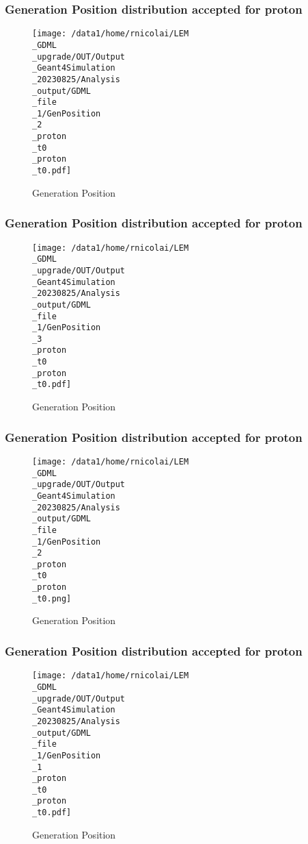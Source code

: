 \documentclass[8pt]{beamer}
\begin{document}
            \begin{frame}
                \frametitle{Generation Position distribution accepted for proton}
            
        \begin{figure}[h]
            \centering
            \texttt{[image: /data1/home/rnicolai/LEM\\\_GDML\\\_upgrade/OUT/Output\\\_Geant4Simulation\\\_20230825/Analysis\\\_output/GDML\\\_file\\\_1/GenPosition\\\_2\\\_proton\\\_t0\\\_proton\\\_t0.pdf]}
            \caption{Generation Position}
        \end{figure}
        
            \end{frame}
            
            \begin{frame}
                \frametitle{Generation Position distribution accepted for proton}
            
        \begin{figure}[h]
            \centering
            \texttt{[image: /data1/home/rnicolai/LEM\\\_GDML\\\_upgrade/OUT/Output\\\_Geant4Simulation\\\_20230825/Analysis\\\_output/GDML\\\_file\\\_1/GenPosition\\\_3\\\_proton\\\_t0\\\_proton\\\_t0.pdf]}
            \caption{Generation Position}
        \end{figure}
        
            \end{frame}
            
            \begin{frame}
                \frametitle{Generation Position distribution accepted for proton}
            
        \begin{figure}[h]
            \centering
            \texttt{[image: /data1/home/rnicolai/LEM\\\_GDML\\\_upgrade/OUT/Output\\\_Geant4Simulation\\\_20230825/Analysis\\\_output/GDML\\\_file\\\_1/GenPosition\\\_2\\\_proton\\\_t0\\\_proton\\\_t0.png]}
            \caption{Generation Position}
        \end{figure}
        
            \end{frame}
            
            \begin{frame}
                \frametitle{Generation Position distribution accepted for proton}
            
        \begin{figure}[h]
            \centering
            \texttt{[image: /data1/home/rnicolai/LEM\\\_GDML\\\_upgrade/OUT/Output\\\_Geant4Simulation\\\_20230825/Analysis\\\_output/GDML\\\_file\\\_1/GenPosition\\\_1\\\_proton\\\_t0\\\_proton\\\_t0.pdf]}
            \caption{Generation Position}
        \end{figure}
        
            \end{frame}
            
\end{document}
